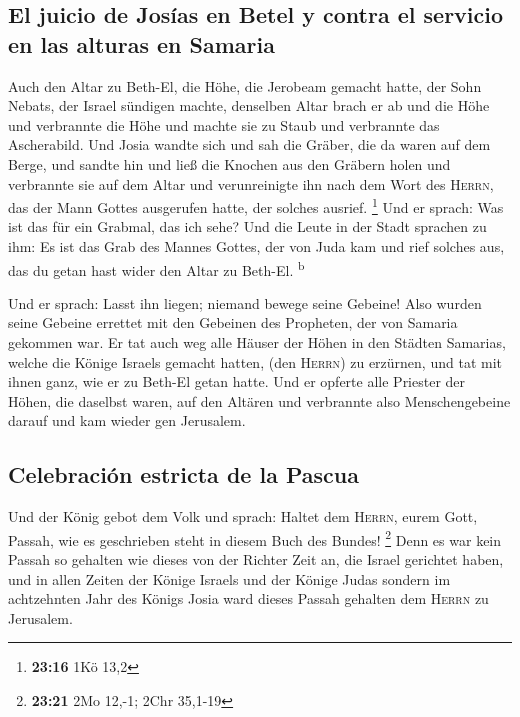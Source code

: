 \hypertarget{el-juicio-de-josuxedas-en-betel-y-contra-el-servicio-en-las-alturas-en-samaria}{%
\subsection{El juicio de Josías en Betel y contra el servicio en las
alturas en
Samaria}\label{el-juicio-de-josuxedas-en-betel-y-contra-el-servicio-en-las-alturas-en-samaria}}

 Auch den Altar zu Beth-El, die Höhe, die Jerobeam
gemacht hatte, der Sohn Nebats, der Israel sündigen machte, denselben
Altar brach er ab und die Höhe und verbrannte die Höhe und machte sie zu
Staub und verbrannte das Ascherabild.  Und Josia wandte
sich und sah die Gräber, die da waren auf dem Berge, und sandte hin und
ließ die Knochen aus den Gräbern holen und verbrannte sie auf dem Altar
und verunreinigte ihn nach dem Wort des \textsc{Herrn}, das der Mann
Gottes ausgerufen hatte, der solches ausrief. \footnote{\textbf{23:16}
  1Kö 13,2}  Und er sprach: Was ist das für ein Grabmal,
das ich sehe? Und die Leute in der Stadt sprachen zu ihm: Es ist das
Grab des Mannes Gottes, der von Juda kam und rief solches aus, das du
getan hast wider den Altar zu Beth-El. \textsuperscript{b}

 Und er sprach: Lasst ihn liegen; niemand bewege seine
Gebeine! Also wurden seine Gebeine errettet mit den Gebeinen des
Propheten, der von Samaria gekommen war.  Er tat auch weg
alle Häuser der Höhen in den Städten Samarias, welche die Könige Israels
gemacht hatten, (den \textsc{Herrn}) zu erzürnen, und tat mit ihnen
ganz, wie er zu Beth-El getan hatte.  Und er opferte alle
Priester der Höhen, die daselbst waren, auf den Altären und verbrannte
also Menschengebeine darauf und kam wieder gen Jerusalem.

\hypertarget{celebraciuxf3n-estricta-de-la-pascua}{%
\subsection{Celebración estricta de la
Pascua}\label{celebraciuxf3n-estricta-de-la-pascua}}

 Und der König gebot dem Volk und sprach: Haltet dem
\textsc{Herrn}, eurem Gott, Passah, wie es geschrieben steht in diesem
Buch des Bundes! \footnote{\textbf{23:21} 2Mo 12,-1; 2Chr 35,1-19}
 Denn es war kein Passah so gehalten wie dieses von der
Richter Zeit an, die Israel gerichtet haben, und in allen Zeiten der
Könige Israels und der Könige Judas  sondern im
achtzehnten Jahr des Königs Josia ward dieses Passah gehalten dem
\textsc{Herrn} zu Jerusalem.

